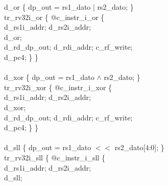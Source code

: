{%
\indent d\_or \{ dp\_out = rs1\_dato $\vert$ rs2\_dato; \}\\%
\indent tr\_rv32i\_or \{ @c\_instr\_i\_or \{ \\%
\indent \hspace{\parindent} d\_rs1i\_addr; d\_rs2i\_addr; \\%
\indent \hspace{\parindent} d\_or; \\%
\indent \hspace{\parindent} d\_rd\_dp\_out; d\_rdi\_addr; c\_rf\_write;  \\%
\indent \hspace{\parindent} d\_pc4; \} \} \\%
\\
\indent d\_xor \{ dp\_out = rs1\_dato $\wedge$ rs2\_dato; \}\\%
\indent tr\_rv32i\_xor \{ @c\_instr\_i\_xor \{ \\%
\indent \hspace{\parindent} d\_rs1i\_addr; d\_rs2i\_addr; \\%
\indent \hspace{\parindent} d\_xor; \\%
\indent \hspace{\parindent} d\_rd\_dp\_out; d\_rdi\_addr; c\_rf\_write;  \\%
\indent \hspace{\parindent} d\_pc4; \} \} \\%
\\
\indent d\_sll \{ dp\_out = rs1\_dato $<<$ rs2\_dato[4:0]; \}\\%
\indent tr\_rv32i\_sll \{ @c\_instr\_i\_sll \{ \\%
\indent \hspace{\parindent} d\_rs1i\_addr; d\_rs2i\_addr; \\%
\indent \hspace{\parindent} d\_sll; \\%
}
